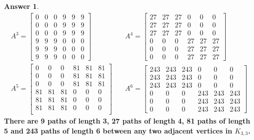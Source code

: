 \documentclass[article, 12pt]{article}
\theoremstyle{definition}
\newtheorem{answer}{Answer}
\begin{document}
\begin{answer}
        \begin{align*}
            A^3 = \begin{bmatrix}
                0 & 0 & 0 & 9 & 9 & 9 \\
                0 & 0 & 0 & 9 & 9 & 9 \\
                0 & 0 & 0 & 9 & 9 & 9 \\
                9 & 9 & 9 & 0 & 0 & 0 \\
                9 & 9 & 9 & 0 & 0 & 0 \\
                9 & 9 & 9 & 0 & 0 & 0
            \end{bmatrix} &\quad A^4 = \begin{bmatrix}
                27 & 27 & 27 & 0 & 0 & 0 \\
                27 & 27 & 27 & 0 & 0 & 0 \\
                27 & 27 & 27 & 0 & 0 & 0 \\
                0 & 0 & 0 & 27 & 27 & 27 \\
                0 & 0 & 0 & 27 & 27 & 27 \\
                0 & 0 & 0 & 27 & 27 & 27
            \end{bmatrix} \\
            A^5 = \begin{bmatrix}
                0 & 0 & 0 & 81 & 81 & 81 \\
                0 & 0 & 0 & 81 & 81 & 81 \\
                0 & 0 & 0 & 81 & 81 & 81 \\
                81 & 81 & 81 & 0 & 0 & 0 \\
                81 & 81 & 81 & 0 & 0 & 0 \\
                81 & 81 & 81 & 0 & 0 & 0 \\
            \end{bmatrix} &\quad A^6 = \begin{bmatrix}
                243 & 243 & 243 & 0 & 0 & 0 \\
                243 & 243 & 243 & 0 & 0 & 0 \\
                243 & 243 & 243 & 0 & 0 & 0 \\
                0 & 0 & 0 & 243 & 243 & 243 \\
                0 & 0 & 0 & 243 & 243 & 243 \\
                0 & 0 & 0 & 243 & 243 & 243
            \end{bmatrix}
        \end{align*}
        \textbf{There are 9 paths of length 3, 27 paths of length 4, 81 paths of length 5 and 243 paths of length 6 between any two adjacent vertices in $K_{3,3}$.}

    \end{answer}
\end{document}
